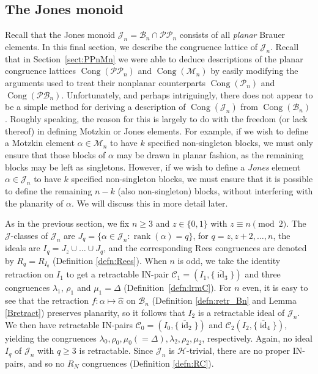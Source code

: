 \documentclass[11pt,a4paper]{article}
\newcommand{\PP}{\mathscr{P}\P}
\newcommand{\M}{\mathcal M}
\newcommand{\C}{\mathscr C}
\newcommand{\B}{\mathcal B}
\renewcommand{\P}{\mathcal P}
\newcommand{\PB}{\mathcal{PB}}
\newcommand{\J}{\mathcal J}
\renewcommand{\H}{\mathrel{\mathscr H}}
\newcommand{\gJ}{\mathrel{\mathscr J}}
\newcommand{\al}{\alpha}
\newcommand{\Cong}{\operatorname{Cong}}
\newcommand{\rank}{\operatorname{rank}}
\newcommand{\id}{\operatorname{id}}
\newcommand{\set}[2]{\{ {#1} : {#2} \}}
\newcommand{\1}{\id_n}
\numberwithin{equation}{section}
\theoremstyle{definition}
\begin{document}
\begin{itemize}
\begin{itemize}
\begin{itemize}
\begin{itemize}
\begin{itemize}
\begin{itemize}
\begin{itemize}
\section{The Jones monoid \boldmath{$\J_n$}}\label{sect:Jn}




Recall that the Jones monoid $\J_n=\B_n\cap\PP_n$ consists of all \emph{planar} Brauer elements.
In this final section, we describe the congruence lattice of $\J_n$.  Recall that in Section~\ref{sect:PPnMn} we were able to deduce descriptions of the planar congruence lattices $\Cong(\PP_n)$ and $\Cong(\M_n)$ by easily modifying the arguments used to treat their nonplanar counterparts $\Cong(\P_n)$ and $\Cong(\PB_n)$.  Unfortunately, and perhaps intriguingly, there does not appear to be a simple method for deriving a description of $\Cong(\J_n)$ from $\Cong(\B_n)$.  Roughly speaking, the reason for this is largely to do with the freedom (or lack thereof) in defining Motzkin or Jones elements.  For example, if we wish to define a Motzkin element $\al\in\M_n$ to have $k$ specified non-singleton blocks, we must only ensure that those blocks of $\al$ may be drawn in planar fashion, as the remaining blocks may be left as singletons.  However, if we wish to define a \emph{Jones} element $\al\in\J_n$ to have $k$ specified non-singleton blocks, we must ensure that it is possible to define the remaining $n-k$ (also non-singleton) blocks, without interfering with the planarity of $\al$.  We will discuss this in more detail later.




As in the previous section, we fix $n\geq3$ and $z\in\{0,1\}$ with $z\equiv n\pmod{2}$.
The $\gJ$-classes of $\J_n$ are $J_q=\set{\alpha\in\J_n}{\rank(\alpha)=q}$, for
$q=z,z+2,\dots,n$, the ideals are $I_q=J_z\cup\dots\cup J_q$, and the corresponding Rees congruences are denoted by $R_q=R_{I_q}$ (Definition \ref{defn:Rees}).
When $n$ is odd, we take the identity retraction on $I_1$ to get a retractable IN-pair $\C_1=(I_1,\{\overline{\id}_3\})$ and three congruences $\lambda_1$, $\rho_1$ and $\mu_1=\Delta$ (Definition~\ref{defn:lrmC}).
For $n$ even, it is easy to see that the retraction $f:\alpha\mapsto\widehat{\alpha}$ on $\B_n$ (Definition \ref{defn:retr_Bn} and Lemma \ref{Bretract}) preserves planarity, so it follows that $I_2$ is a retractable ideal of $\J_n$.
We then have retractable IN-pairs $\C_0=(I_0,\{\overline{\id}_2\})$
and $\C_2(I_2,\{\overline{\id}_4\})$, yielding the congruences $\lambda_0,\rho_0,\mu_0(=\Delta),\lambda_2,\rho_2,\mu_2$, respectively.  Again, no ideal $I_q$ of $\J_n$ with $q\geq3$ is retractable.  Since $\J_n$ is $\H$-trivial, there are no proper IN-pairs, and so no $R_N$ congruences (Definition \ref{defn:RC}).


\end{itemize}
\end{itemize}
\end{itemize}
\end{itemize}
\end{itemize}
\end{itemize}
\end{itemize}
\end{document}
